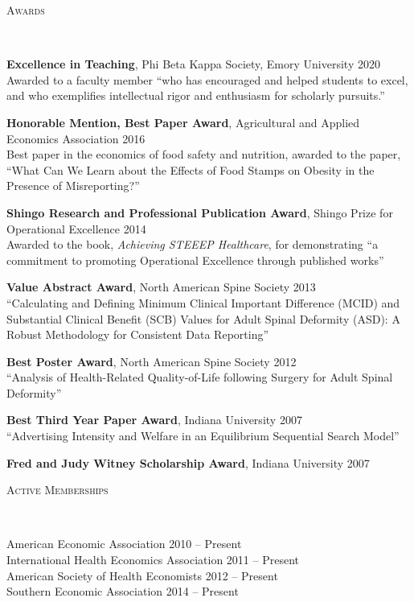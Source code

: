 \documentclass[9pt]{article}
\newenvironment{changemargin}[2]{%
  \begin{list}{}{%
    \setlength{\topsep}{0pt}%
    \setlength{\leftmargin}{#1}%
    \setlength{\rightmargin}{#2}%
    \setlength{\listparindent}{\parindent}%
    \setlength{\itemindent}{\parindent}%
    \setlength{\parsep}{\parskip}%
  }%
  \item[]}{\end{list}
}
\newcommand{\lineover}{
	\begin{changemargin}{-0.05in}{-0.05in}
		\vspace*{-8pt}
		\hrulefill \\
		\vspace*{-2pt}
	\end{changemargin}
}
\newcommand{\header}[1]{
	\begin{changemargin}{-0.5in}{-0.5in}
		\scshape{#1}\\
  	\lineover
	\end{changemargin}
}
\newenvironment{body} {
	\vspace*{-16pt}
	\begin{changemargin}{-0.25in}{-0.5in}
  }	
	{\end{changemargin}
}
\begin{document}
\header{Awards}
\begin{body}
 \vspace{14pt}
 \textbf{Excellence in Teaching}, Phi Beta Kappa Society, Emory University \hfill 2020 \\
 Awarded to a faculty member ``who has encouraged and helped students to excel, and who exemplifies intellectual rigor and enthusiasm for scholarly pursuits.''

 \medskip
 \textbf{Honorable Mention, Best Paper Award}, Agricultural and Applied Economics Association \hfill 2016 \\
 Best paper in the economics of food safety and nutrition, awarded to the paper, ``What Can We Learn about the Effects of Food Stamps on Obesity in the Presence of Misreporting?''

 \medskip
 \textbf{Shingo Research and Professional Publication Award}, Shingo Prize for Operational Excellence \hfill 2014 \\
 Awarded to the book, \textit{Achieving STEEEP Healthcare}, for demonstrating ``a commitment to promoting Operational Excellence through published works''

 \medskip
 \textbf{Value Abstract Award}, North American Spine Society \hfill 2013 \\
 ``Calculating and Defining Minimum Clinical Important Difference (MCID) and Substantial Clinical Benefit (SCB) Values for Adult Spinal Deformity (ASD): A Robust Methodology for Consistent Data Reporting''

 \medskip
 \textbf{Best Poster Award}, North American Spine Society \hfill 2012 \\
 ``Analysis of Health-Related Quality-of-Life following Surgery for Adult Spinal Deformity''

 \medskip
 \textbf{Best Third Year Paper Award}, Indiana University \hfill 2007 \\
 ``Advertising Intensity and Welfare in an Equilibrium Sequential Search Model''

 \medskip
 \textbf{Fred and Judy Witney Scholarship Award}, Indiana University \hfill 2007
\end{body}
\smallskip

\header{Active Memberships}
\begin{body}
  \vspace{14pt}
  American Economic Association \hfill 2010 -- Present \\
  International Health Economics Association \hfill 2011 -- Present \\
  American Society of Health Economists \hfill 2012 -- Present \\
  Southern Economic Association \hfill 2014 -- Present \\
\end{body}
\smallskip
\end{document}
